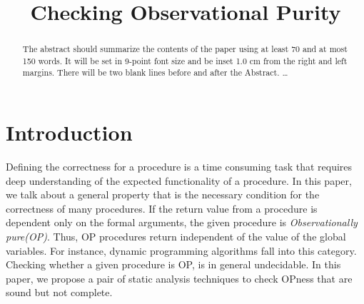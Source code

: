 \documentclass{llncs}
\begin{document}
\mainmatter              %
%
\title{Checking Observational Purity}
%
%

\maketitle              %

\begin{abstract}
The abstract should summarize the contents of the paper
using at least 70 and at most 150 words. It will be set in 9-point
font size and be inset 1.0 cm from the right and left margins.
There will be two blank lines before and after the Abstract. \dots
{}
\end{abstract}

\section{Introduction}
Defining the correctness for a procedure is a time consuming task that
requires deep understanding of the expected functionality of a
procedure. In this paper, we talk about a general property that is the
necessary condition for the correctness of many procedures. If the
return value from a procedure is dependent only on the formal
arguments, the given procedure is \textit{Observationally
  pure(OP)}. Thus, OP procedures return independent of the value of
the global variables. For instance, dynamic programming algorithms
fall into this category. Checking whether a given procedure is OP, is
in general undecidable. In this paper, we propose a pair of static
analysis techniques to check OPness that are sound but not complete.
\end{document}
